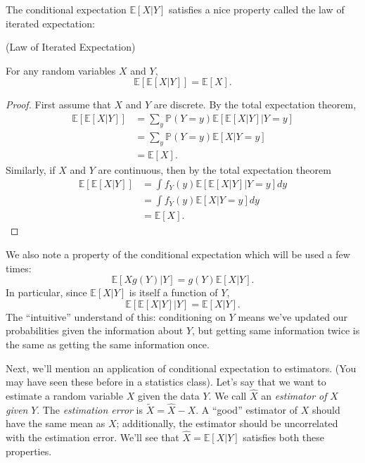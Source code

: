 \documentclass{ximera}
\begin{document}
The conditional expectation $\mathbb{E}[X \vert Y]$ satisfies a nice property called the law of iterated expectation:

\begin{theorem} (Law of Iterated Expectation)

For any random variables $X$ and $Y$,
$$
\mathbb{E}[\mathbb{E}[X \vert Y]] = \mathbb{E}[X].
$$
\end{theorem}
\begin{proof}
First assume that $X$ and $Y$ are discrete. By the total expectation theorem,
\begin{align*}
\mathbb{E}[ \mathbb{E}[X \vert Y]] &= \sum_y \mathbb{P}(Y=y) \mathbb{E}[ \mathbb{E}[X \vert Y] \vert Y=y] \\
&= \sum_y  \mathbb{P}(Y=y) \mathbb{E}[X  \vert Y=y] \\
&= \mathbb{E}[X].
\end{align*}
Similarly, if $X$ and $Y$ are continuous, then by the total expectation theorem
\begin{align*}
\mathbb{E}[ \mathbb{E}[X \vert Y]]&= \int f_Y(y) \mathbb{E}[ \mathbb{E}[X \vert Y] \vert Y=y]dy  \\
&= \int f_Y(y) \mathbb{E}[ X \vert Y=y]dy\\
&= \mathbb{E}[X].
\end{align*}
\end{proof}

We also note a property of the conditional expectation which will be used a few times: 
$$
\mathbb{E}[X g(Y) \vert Y] = g(Y) \mathbb{E}[X \vert Y].
$$
In particular, since $\mathbb{E}[X \vert Y]$ is itself a function of $Y$,
$$
\mathbb{E}[\mathbb{E}[X \vert Y] \vert Y] = \mathbb{E}[X \vert Y].
$$
The ``intuitive'' understand of this: conditioning on $Y$ means we've updated our probabilities given the information about $Y$, but getting same information twice is the same as getting the same information once.

Next, we'll mention an application of conditional expectation to estimators. (You may have seen these before in a statistics class). Let's say that we want to estimate a random variable $X$ given the data $Y$. We call $\widehat{X}$ an \textit{estimator of }$ X$ \textit{given} $Y$. The \textit{estimation error} is $\widetilde{X} = \widehat{X} - X$. A ``good'' estimator of $X$ should have the same mean as $X$; additionally, the estimator should be uncorrelated with the estimation error. We'll see that $\widehat{X} = \mathbb{E}[X \vert Y]$ satisfies both these properties. 
\end{document}
